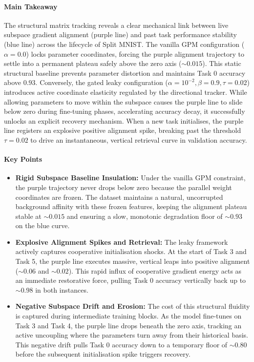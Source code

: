 \documentclass[10pt,a4paper]{article}
\begin{document}
		\paragraph{Main Takeaway}
		The structural matrix tracking reveals a clear mechanical link between live subspace gradient alignment (purple line) and past task performance stability (blue line) across the lifecycle of Split MNIST. The vanilla GPM configuration ($\alpha=0.0$) locks parameter coordinates, forcing the purple alignment trajectory to settle into a permanent plateau safely above the zero axis ($\sim 0.015$). This static structural baseline prevents parameter distortion and maintains Task 0 accuracy above $0.93$. Conversely, the gated leaky configuration ($\alpha=10^{-2}, \beta=0.9, \tau=0.02$) introduces active coordinate elasticity regulated by the directional tracker. While allowing parameters to move within the subspace causes the purple line to slide below zero during fine-tuning phases, accelerating accuracy decay, it successfully unlocks an explicit recovery mechanism. When a new task initialises, the purple line registers an explosive positive alignment spike, breaking past the threshold $\tau=0.02$ to drive an instantaneous, vertical retrieval curve in validation accuracy.
		
		\paragraph{Key Points}
		\begin{itemize}
		\item \textbf{Rigid Subspace Baseline Insulation:} Under the vanilla GPM constraint, the purple trajectory never drops below zero because the parallel weight coordinates are frozen. The dataset maintains a natural, uncorrupted background affinity with these frozen features, keeping the alignment plateau stable at $\sim 0.015$ and ensuring a slow, monotonic degradation floor of $\sim 0.93$ on the blue curve.
		\item \textbf{Explosive Alignment Spikes and Retrieval:} The leaky framework actively captures cooperative initialisation shocks. At the start of Task 3 and Task 5, the purple line executes massive, vertical leaps into positive alignment ($\sim 0.06$ and $\sim 0.02$). This rapid influx of cooperative gradient energy acts as an immediate restorative force, pulling Task 0 accuracy vertically back up to $\sim 0.98$ in both instances.
		\item \textbf{Negative Subspace Drift and Erosion:} The cost of this structural fluidity is captured during intermediate training blocks. As the model fine-tunes on Task 3 and Task 4, the purple line drops beneath the zero axis, tracking an active uncoupling where the parameters turn away from their historical basis. This negative drift pulls Task 0 accuracy down to a temporary floor of $\sim 0.80$ before the subsequent initialisation spike triggers recovery.
		\end{itemize}
		
\end{document}
